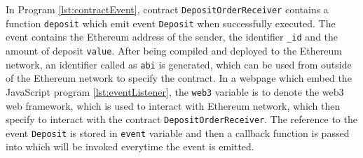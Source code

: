In Program \ref{lst:contractEvent}, contract \texttt{DepositOrderReceiver} contains a function \texttt{deposit} which emit event \texttt{Deposit} when successfully executed. The event contains the Ethereum address of the sender, the identifier \texttt{\_id} and the amount of deposit \texttt{value}. After being compiled and deployed to the Ethereum network, an identifier called as \texttt{abi} is generated, which can be used from outside of the Ethereum network to specify the contract. In a webpage which embed the JavaScript program \ref{lst:eventListener},  the \texttt{web3} variable is to denote the web3 web framework, which is used to interact with Ethereum network, which then specify to interact with the contract \texttt{DepositOrderReceiver}. The reference to the event \texttt{Deposit} is stored in \texttt{event} variable and then a callback function is passed into which will be invoked everytime the event is emitted.